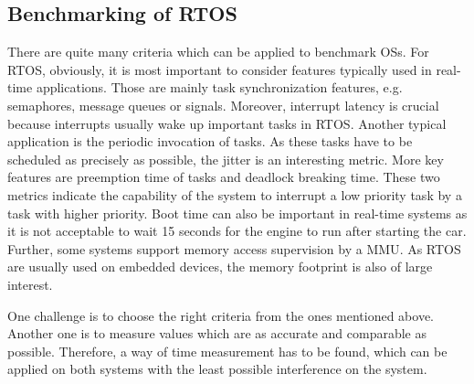 \subsection{Benchmarking of RTOS}
There are quite many criteria which can be applied to benchmark \acp{OS}.
For \ac{RTOS}, obviously, it is most important to consider features typically used in real-time applications.
Those are mainly task synchronization features, e.g. semaphores, message queues or signals.
Moreover, interrupt latency is crucial because interrupts usually wake up important tasks in \ac{RTOS}.
Another typical application is the periodic invocation of tasks. 
As these tasks have to be scheduled as precisely as possible, the jitter is an interesting metric.
More key features are preemption time of tasks and deadlock breaking time.
These two metrics indicate the capability of the system to interrupt a low priority task by a task with higher priority. 
Boot time can also be important in real-time systems as it is not acceptable to wait 15 seconds for the engine to run after starting the car.
Further, some systems support memory access supervision by a \ac{MMU}.
As \ac{RTOS} are usually used on embedded devices, the memory footprint is also of large interest. 
\par
One challenge is to choose the right criteria from the ones mentioned above. 
Another one is to measure values which are as accurate and comparable as possible.
Therefore, a way of time measurement has to be found, which can be applied on both systems with the least possible interference on the system.

